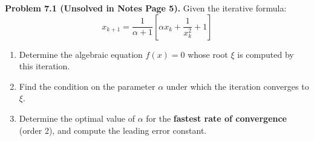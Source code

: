 \documentclass[11pt,a4paper]{article}
\numberwithin{equation}{section}
\begin{document}
\begin{thmbox}
\textbf{Problem 7.1 (Unsolved in Notes Page 5).}
Given the iterative formula:
\begin{equation}
    x_{k+1} = \frac{1}{\alpha + 1} \left[ \alpha x_k + \frac{1}{x_k^2} + 1 \right]
\end{equation}
\begin{enumerate}[label=(\alph*)]
    \item Determine the algebraic equation $f(x) = 0$ whose root $\xi$ is computed by this iteration.
    \item Find the condition on the parameter $\alpha$ under which the iteration converges to $\xi$.
    \item Determine the optimal value of $\alpha$ for the \textbf{fastest rate of convergence} (order 2), and compute the leading error constant.
\end{enumerate}
\end{thmbox}
\end{document}
